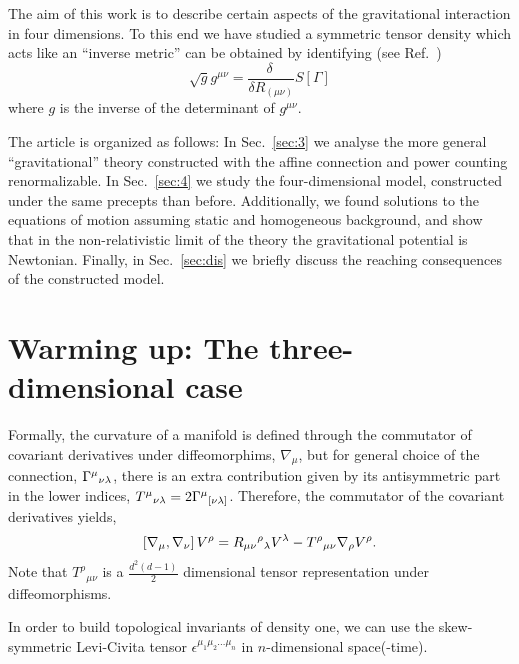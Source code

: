 \documentclass[twocolumn,aps,
  showpacs,showkeys,prd,superscriptaddress]{revtex4-1}
\begin{document}
The aim of this work is to describe certain aspects of the gravitational interaction in four dimensions. To this end we have studied a  symmetric tensor density which acts like an ``inverse metric'' can be obtained by identifying (see Ref.~\cite{Poplawski:2012bw})
\begin{equation}\label{metric}
  \sqrt{g} g^{\mu\nu} = \frac{\delta\ }{\delta R_{(\mu\nu)}} S[\Gamma]
\end{equation}
where $g$ is the inverse of the determinant of $g^{\mu\nu}$.

The article is organized as follows: In Sec.~\ref{sec:3} we analyse the more general ``gravitational'' theory constructed with the affine connection and power counting renormalizable. In Sec.~\ref{sec:4} we study the four-dimensional model, constructed under the same precepts than before. Additionally, we found solutions to the equations of motion assuming static and homogeneous background, and show that in the non-relativistic limit of the theory the gravitational potential is Newtonian. Finally, in Sec.~\ref{sec:dis} we briefly discuss the reaching consequences of the constructed model.



\section{\label{sec:3} Warming up: The three-dimensional case}


Formally, the curvature of a manifold is defined through the commutator of covariant derivatives under diffeomorphims, $\nabla_\mu$, but for general choice of the connection, $\Gamma^\mu{}_{\nu\lambda}$, there is an extra contribution given by its antisymmetric part in the lower indices, $T^\mu{}_{\nu\lambda} = 2\Gamma^\mu{}_{[\nu\lambda]}$. Therefore, the commutator of the covariant derivatives yields,
\begin{equation}
  \left[\nabla_{\mu},\nabla_{\nu}\right]V^\rho = R_{\mu\nu}{}^\rho{}_\lambda V^\lambda - T^\rho{}_{\mu\nu}\nabla_{{\rho}}V^\rho.
  \label{curvdef}
\end{equation}
Note that $T^\rho{}_{\mu\nu}$ is a $\tfrac{d^2(d-1)}{2}$ dimensional tensor representation under diffeomorphisms.

In order to build topological invariants of density one, we can use the skew-symmetric Levi-Civita tensor $\epsilon^{\mu_1\mu_2\dots\mu_n}$ in $n$-dimensional space(-time).
\end{document}
